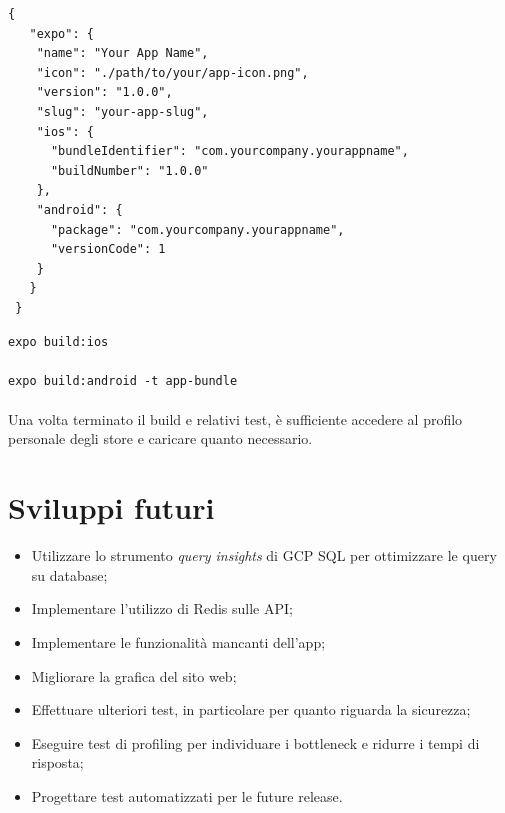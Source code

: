 \documentclass[11pt,a4paper,english]{article}
\begin{document}
\begin{lstlisting}[title=Struttura del file di configurazione]
{
   "expo": {
    "name": "Your App Name",
    "icon": "./path/to/your/app-icon.png",
    "version": "1.0.0",
    "slug": "your-app-slug",
    "ios": {
      "bundleIdentifier": "com.yourcompany.yourappname",
      "buildNumber": "1.0.0"
    },
    "android": {
      "package": "com.yourcompany.yourappname",
      "versionCode": 1
    }
   }
 }
\end{lstlisting}

\begin{lstlisting}[title=Comandi per effettuare il build delle due app]
expo build:ios     

expo build:android -t app-bundle
\end{lstlisting}

\paragraph{} Una volta terminato il build e relativi test, è sufficiente accedere al profilo personale degli store e caricare quanto necessario. 
 

\section{Sviluppi futuri}

\begin{itemize}
    \item Utilizzare lo strumento \emph{query insights} di GCP SQL per ottimizzare le query su database;
    \item Implementare l'utilizzo di Redis sulle API;
    \item Implementare le funzionalità mancanti dell'app;
    \item Migliorare la grafica del sito web;
    \item Effettuare ulteriori test, in particolare per quanto riguarda la sicurezza;
    \item Eseguire test di profiling per individuare i bottleneck e ridurre i tempi di risposta;
    \item Progettare test automatizzati per le future release.
\end{itemize} 
\end{document}
